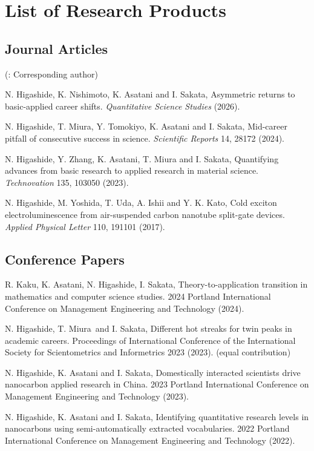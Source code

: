 \documentclass[10pt,a4paper]{article}
\newcommand{\pubitem}[1]{%
  \item #1
}
\begin{document}
\section{List of Research Products}
\subsection{Journal Articles}
(\textdaggerdbl: Corresponding author)
\begin{publist}
\pubitem{N. Higashide\textdaggerdbl, K. Nishimoto, K. Asatani and I. Sakata, Asymmetric returns to basic-applied career shifts. \textit{Quantitative Science Studies} (2026).}
\pubitem{N. Higashide\textdaggerdbl, T. Miura, Y. Tomokiyo, K. Asatani and I. Sakata, Mid-career pitfall of consecutive success in science. \textit{Scientific Reports} 14, 28172 (2024).}
\pubitem{N. Higashide\textdaggerdbl, Y. Zhang, K. Asatani, T. Miura and I. Sakata, Quantifying advances from basic research to applied research in material science. \textit{Technovation} 135, 103050 (2023).}
\pubitem{N. Higashide, M. Yoshida, T. Uda, A. Ishii and Y. K. Kato, Cold exciton electroluminescence from air-suspended carbon nanotube split-gate devices. \textit{Applied Physical Letter} 110, 191101 (2017).}
\end{publist}

\subsection{Conference Papers}
\begin{publist}[resume]
\pubitem{R. Kaku, K. Asatani, N. Higashide, I. Sakata, Theory-to-application transition in mathematics and computer science studies. 2024 Portland International Conference on Management Engineering and Technology (2024).}
\pubitem{N. Higashide\textdagger, T. Miura\textdagger\ and I. Sakata, Different hot streaks for twin peaks in academic careers. Proceedings of International Conference of the International Society for Scientometrics and Informetrics 2023 (2023). (\textdagger equal contribution)}
\pubitem{N. Higashide, K. Asatani and I. Sakata, Domestically interacted scientists drive nanocarbon applied research in China. 2023 Portland International Conference on Management Engineering and Technology (2023).}
\pubitem{N. Higashide, K. Asatani and I. Sakata, Identifying quantitative research levels in nanocarbons using semi-automatically extracted vocabularies. 2022 Portland International Conference on Management Engineering and Technology (2022).}
\end{publist}
\end{document}
